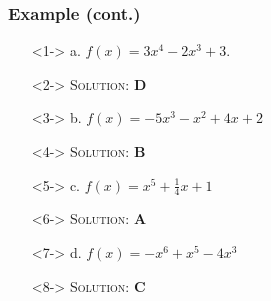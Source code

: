 \documentclass{beamer}
\begin{document}
\begin{frame}
  \frametitle{Example (cont.)}
    \begin{enumerate}
      \item[]<1-> a. $f(x)=3x^{4}-2x^{3}+3$.
      \item[]<2-> \textsc{Solution:} \textbf{D}
      \item[]<3-> b. $f(x)=-5x^{3}-x^{2}+4x+2$
      \item[]<4-> \textsc{Solution:} \textbf{B}
      \item[]<5-> c. $f(x)=x^{5}+\frac{1}{4}x+1$
      \item[]<6-> \textsc{Solution:} \textbf{A}
      \item[]<7-> d. $f(x)=-x^{6}+x^{5}-4x^{3}$
      \item[]<8-> \textsc{Solution:} \textbf{C} 
    \end{enumerate}
\end{frame}
\end{document}
